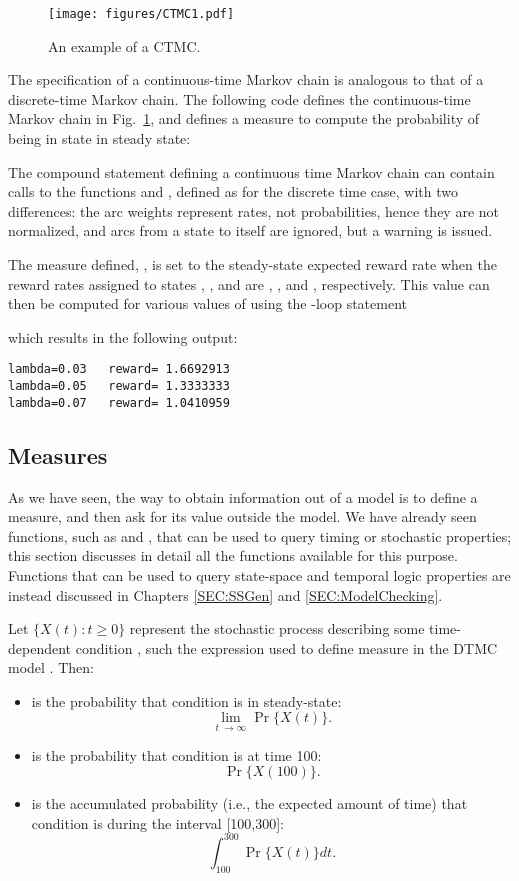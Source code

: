 \begin{figure}
  \centering
  \texttt{[image: figures/CTMC1.pdf]}
  \caption{An example of a CTMC.}
  \label{FIG:CTMC1}
\end{figure}


The specification of a continuous-time Markov chain is analogous to that
of a discrete-time Markov chain.
The following code defines the continuous-time Markov chain
in Fig.~\ref{FIG:CTMC1}, and defines a measure to compute the probability
of being in state  in steady state:
%

%
The compound statement defining a continuous time Markov chain can
contain calls to the functions  and ,
defined as for the discrete time case, with two differences:
the arc weights represent rates, not probabilities,
hence they are not normalized, and
arcs from a state to itself are ignored, but a warning is issued.

The measure defined, , is set to the steady-state expected reward rate
when the reward rates assigned to states , , and 
are , , and , respectively.
This value can then be computed for various
values of  using the -loop statement
%

%
which results in the following output:
\begin{lstlisting}
lambda=0.03   reward= 1.6692913
lambda=0.05   reward= 1.3333333
lambda=0.07   reward= 1.0410959
\end{lstlisting}


\subsection{Measures}

As we have seen, the way to obtain information out of a
model is to define a measure, and then ask for its value outside the model.
We have already seen functions, such as  and ,
that can be used to query timing or stochastic properties;
this section discusses in detail all the functions available for this purpose.
Functions that can be used to query state-space and temporal logic properties
are instead discussed in Chapters \ref{SEC:SSGen} and \ref{SEC:ModelChecking}.

Let $\{X(t):t\geq 0\}$ represent the stochastic process describing
some time-dependent  condition ,
such the expression 
used to define measure  in the DTMC model .
Then:
\begin{itemize}
\item
{} is
the probability that condition  is  in steady-state:
$$\lim_{t\ \rightarrow \infty} \Pr\{X(t)\}.$$
\item
{} is
the probability that condition  is  at time 100:
$$\Pr\{X(100)\}.$$
\item
{} is
the accumulated probability (i.e., the expected amount of time) that condition
 is  during the interval [100,300]:
$$\int_{100}^{300} \Pr\{X(t)\} dt.$$
\end{itemize}

